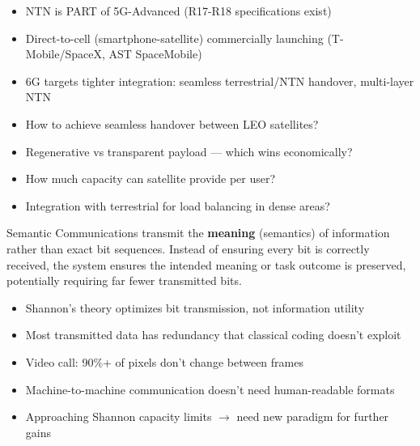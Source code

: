 
\begin{itemize}
\tightlist
\item
  NTN is PART of 5G-Advanced (R17-R18 specifications exist)
\item
  Direct-to-cell (smartphone-satellite) commercially launching (T-Mobile/\allowbreak{}SpaceX, AST SpaceMobile)
\item
  6G targets tighter integration: seamless terrestrial/\allowbreak{}NTN handover, multi-layer NTN
\end{itemize}


\begin{itemize}
\tightlist
\item
  How to achieve seamless handover between LEO satellites?
\item
  Regenerative vs transparent payload — which wins economically?
\item
  How much capacity can satellite provide per user?
\item
  Integration with terrestrial for load balancing in dense areas?
\end{itemize}



\CNchained{}

\CNchained{}

Semantic Communications transmit the \textbf{meaning} (semantics) of information rather than exact bit sequences. Instead of ensuring every bit is correctly received, the system ensures the intended meaning or task outcome is preserved, potentially requiring far fewer transmitted bits.


\begin{itemize}
\tightlist
\item
  Shannon’s theory optimizes bit transmission, not information utility
\item
  Most transmitted data has redundancy that classical coding doesn’t exploit
\item
  Video call: 90\%+ of pixels don’t change between frames
\item
  Machine-to-machine communication doesn’t need human-readable formats
\item
  Approaching Shannon capacity limits \ensuremath{\to} need new paradigm for further gains
\end{itemize}

